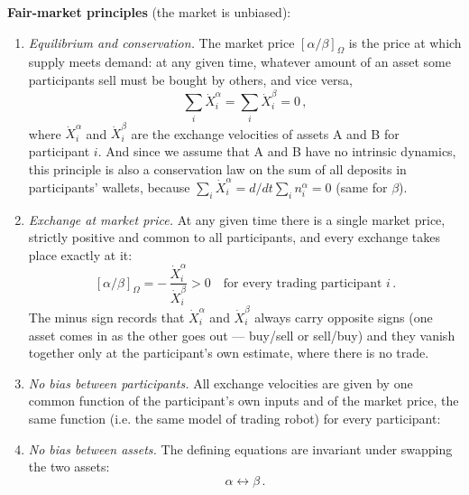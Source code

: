 \documentclass[letterpaper]{article}
\newcommand{\priceAB}{\left[\alpha / \beta\right]}
\begin{document}
\textbf{Fair-market principles} (the market is unbiased):
\begin{enumerate}
    \item \emph{Equilibrium and conservation.} The market price $\priceAB_\Omega$ is the price at which supply meets demand: at any given time, whatever amount of an asset some participants sell must be bought by others, and vice versa,
    \begin{equation*}
        \sum_i \dot{X}_i^\alpha = \sum_i \dot{X}_i^\beta = 0\,,
    \end{equation*}
    where $\dot{X}_i^\alpha$ and $\dot{X}_i^\beta$ are the exchange velocities of assets A and B for participant $i$.
    And since we assume that A and B have no intrinsic dynamics, this principle is also a conservation law on the sum of all deposits in participants' wallets, because $\sum_i \dot{X}_i^\alpha = d/dt \sum_i n_i^\alpha = 0$ (same for $\beta$).
    \item \emph{Exchange at market price.} At any given time there is a single market price, strictly positive and common to all participants, and every exchange takes place exactly at it:
    \begin{equation*}
        \priceAB_\Omega = -\,\frac{\dot{X}_i^\alpha}{\dot{X}_i^\beta} > 0 \quad \text{for every trading participant } i\,.
    \end{equation*}
    The minus sign records that $\dot{X}_i^\alpha$ and $\dot{X}_i^\beta$ always carry opposite signs (one asset comes in as the other goes out --- buy/sell or sell/buy) and they vanish together only at the participant's own estimate, where there is no trade.
    \item \emph{No bias between participants.} All exchange velocities are given by one common function of the participant's own inputs and of the market price, the same function (i.e. the same model of trading robot) for every participant:
    \begin{center}
    \end{center}
    \item \emph{No bias between assets.} The defining equations are invariant under swapping the two assets:
    \begin{equation*}
        \alpha \leftrightarrow \beta \,.
    \end{equation*}
\end{enumerate}
\end{document}
